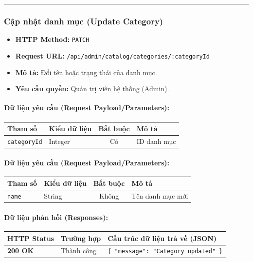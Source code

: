 \documentclass[12pt,a4paper]{article}
\begin{document}
\vskip 0.4cm
\noindent\rule{\textwidth}{0.3pt}
\vskip 0.4cm

\subsubsection{Cập nhật danh mục (Update Category)}
\begin{itemize}[leftmargin=*]
    \item \textbf{HTTP Method:} \texttt{PATCH}
    \item \textbf{Request URL:} \texttt{/api/admin/catalog/categories/:categoryId}
    \item \textbf{Mô tả:} Đổi tên hoặc trạng thái của danh mục.
    \item \textbf{Yêu cầu quyền:} Quản trị viên hệ thống (Admin).
\end{itemize}

\paragraph{Dữ liệu yêu cầu (Request Payload/Parameters):}
\begin{longtable}{|>{\raggedright\arraybackslash}p{2.8cm}|>{\raggedright\arraybackslash}p{2.2cm}|c|>{\raggedright\arraybackslash}p{7.0cm}|}
\hline
\textbf{Tham số} & \textbf{Kiểu dữ liệu} & \textbf{Bắt buộc} & \textbf{Mô tả} \\ \hline
\endhead
\texttt{categoryId} & Integer & Có & ID danh mục \\ \hline
\end{longtable}

\paragraph{Dữ liệu yêu cầu (Request Payload/Parameters):}
\begin{longtable}{|>{\raggedright\arraybackslash}p{2.8cm}|>{\raggedright\arraybackslash}p{2.2cm}|c|>{\raggedright\arraybackslash}p{7.0cm}|}
\hline
\textbf{Tham số} & \textbf{Kiểu dữ liệu} & \textbf{Bắt buộc} & \textbf{Mô tả} \\ \hline
\endhead
\texttt{name} & String & Không & Tên danh mục mới \\ \hline
\end{longtable}

\paragraph{Dữ liệu phản hồi (Responses):}
\begin{longtable}{|>{\raggedright\arraybackslash}p{2.8cm}|>{\raggedright\arraybackslash}p{3.2cm}|>{\raggedright\arraybackslash}p{8.0cm}|}
\hline
\textbf{HTTP Status} & \textbf{Trường hợp} & \textbf{Cấu trúc dữ liệu trả về (JSON)} \\ \hline
\endhead
\textbf{200 OK} & Thành công & \texttt{\{ "message": "Category updated" \}} \\ \hline
\end{longtable}
\end{document}
